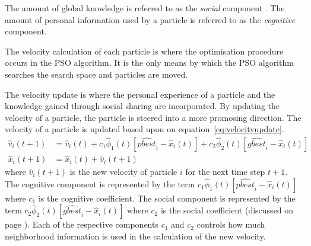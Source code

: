 The amount of global knowledge is referred to as the \emph{social} \label{def:socialcomponent} component \cite{FundamentalSwarm,CompuIntelligenceIntro,PSOSelfHierarch,SOSwarm}. The amount of personal information used by a particle is referred to as the \emph{cognitive} \label{def:cognitivecomponent} component\cite{FundamentalSwarm,CompuIntelligenceIntro,PSOSelfHierarch,SOSwarm}.

The velocity calculation of each particle is where the optimisation procedure occurs in the \gls{PSO} algorithm. It is the only means by which the \gls{PSO} algorithm searches the search space and particles are moved\cite{CompuIntelligenceIntro}.

The velocity update is where the personal experience of a particle and the knowledge gained through social sharing are incorporated. By updating the velocity of a particle, the particle is steered into a more promosing direction. The velocity of a particle is updated based upon on equation~\ref{eq:velocityupdate}.
\begin{align}
\hat{v}_i(t+1) &= \hat{v}_i(t) + c_1\hat{\phi}_1(t)[\hat{pbest}_i - \hat{x}_i(t)] + c_2\hat{\phi}_2(t)[\hat{gbest}_i - \hat{x}_i(t)]\label{eq:velocityupdate}\\
\hat{x}_i(t+1) &= \hat{x}_i(t) + \hat{v}_i(t+1)\label{eq:positionupdate}
\end{align}
where $\hat{v}_i(t+1)$ is the new velocity of particle $i$ for the next time step $t+1$. The cognitive component is represented by the term $c_1\hat{\phi}_1(t)[\hat{pbest}_i - \hat{x}_i(t)]$ where $c_1$ is the cognitive coefficient. The social component is represented by the term $c_2\hat{\phi}_2(t)[\hat{gbest}_i - \hat{x}_i(t)]$ where $c_2$ is the social coefficient (discussed on page \pageref{def:cognitivecomponent})\cite{FundamentalSwarm,CompuIntelligenceIntro}. Each of the respective components $c_1$ and $c_2$ controls how much neighborhood information is used in the calculation of the new velocity. 

